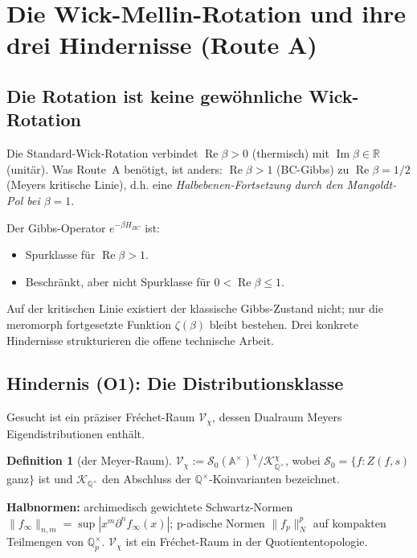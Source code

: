 \documentclass[11pt,a4paper]{article}
\theoremstyle{plain}
\theoremstyle{definition}
\newtheorem{definition}[theorem]{Definition}
\newcommand{\R}{\mathbb{R}}
\newcommand{\Q}{\mathbb{Q}}
\newcommand{\A}{\mathbb{A}}
\newcommand{\V}{\mathcal{V}}
\renewcommand{\S}{\mathcal{S}}
\newcommand{\K}{\mathcal{K}}
\newcommand{\chifn}{\chi}
\renewcommand{\Re}{\operatorname{Re}}
\renewcommand{\Im}{\operatorname{Im}}
\begin{document}
\section{Die Wick-Mellin-Rotation und ihre drei Hindernisse (Route A)}
\label{sec:wick-mellin-obstacles}

\subsection{Die Rotation ist keine gewöhnliche Wick-Rotation}

Die Standard-Wick-Rotation verbindet $\Re\beta > 0$ (thermisch) mit
$\Im\beta \in \R$ (unitär). Was Route~A benötigt, ist anders:
$\Re\beta > 1$ (BC-Gibbs) zu $\Re\beta = 1/2$ (Meyers kritische Linie),
d.h. eine \emph{Halbebenen-Fortsetzung durch den Mangoldt-Pol bei
$\beta = 1$}.

Der Gibbs-Operator $e^{-\beta H_{BC}}$ ist:
\begin{itemize}
\item Spurklasse für $\Re\beta > 1$.
\item Beschränkt, aber nicht Spurklasse für $0 < \Re\beta \leq 1$.
\end{itemize}

Auf der kritischen Linie existiert der klassische Gibbs-Zustand nicht;
nur die meromorph fortgesetzte Funktion $\zeta(\beta)$ bleibt bestehen.
Drei konkrete Hindernisse strukturieren die offene technische Arbeit.

\subsection{Hindernis (O1): Die Distributionsklasse}

Gesucht ist ein präziser Fréchet-Raum $\V_\chifn$, dessen Dualraum
Meyers Eigendistributionen enthält.

\begin{definition}[der Meyer-Raum]
\label{def:meyer-space}
$\V_\chifn := \S_0(\A^\times)^\chifn / \K_{\Q^\times}^\chifn$,
wobei $\S_0 = \{f : Z(f, s)$ ganz$\}$ ist und $\K_{\Q^\times}$ den
Abschluss der $\Q^\times$-Koinvarianten bezeichnet.
\end{definition}

\textbf{Halbnormen:} archimedisch gewichtete Schwartz-Normen
$\|f_\infty\|_{n,m} = \sup |x^m \partial^n f_\infty(x)|$; p-adische
Normen $\|f_p\|_N^p$ auf kompakten Teilmengen von $\Q_p^\times$.
$\V_\chifn$ ist ein Fréchet-Raum in der Quotiententopologie.
\end{document}
